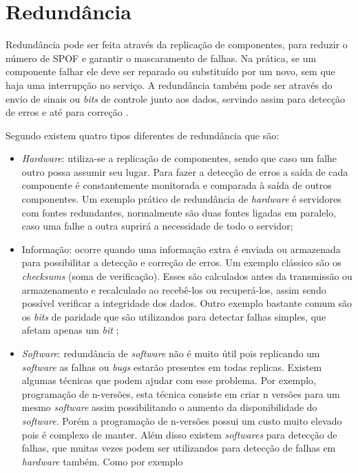\section{Redundância}
\label{section:redundancia}

Redundância pode ser feita através da replicação de componentes, para reduzir o número de \ac{SPOF} e garantir o mascaramento de falhas.
Na prática, se um componente falhar ele deve ser reparado ou substituído por um novo, sem que haja uma interrupção no serviço.
A redundância também pode ser através do envio de sinais ou \textit{bits} de controle junto aos dados, 
servindo assim para detecção de erros e até para correção \cite{weber2002}.

Segundo \cite{norvag2000} existem quatro tipos diferentes de redundância que são:
\begin{itemize}
 \item \textit{Hardware}: utiliza-se a replicação de componentes, sendo que caso um falhe outro possa assumir seu lugar. 
 Para fazer a detecção de erros a saída de cada componente é constantemente monitorada e comparada à saída de outros componentes.
 Um exemplo prático de redundância de \textit{hardware} é servidores com fontes redundantes, normalmente são duas fontes ligadas em paralelo, 
 caso uma falhe a outra suprirá a necessidade de todo o servidor;
 \item Informação: ocorre quando uma informação extra é enviada ou armazenada para possibilitar a detecção e correção de erros.
 Um exemplo clássico são os \textit{checksums} (soma de verificação). Esses são calculados antes da transmissão ou armazenamento 
 e recalculado ao recebê-los ou recuperá-los, assim sendo possível verificar a integridade dos dados. Outro exemplo bastante comum são os 
 \textit{bits} de paridade que são utilizandos para detectar falhas simples, que afetam apenas um \textit{bit} \cite{weber2002};
 \item \textit{Software}: redundância de \textit{software} não é muito útil pois replicando um \textit{software} as falhas ou 
 \textit{bugs} estarão presentes em todas replicas. Existem algumas técnicas que podem ajudar com esse problema. Por exemplo, programação 
 de n-versões, esta técnica consiste em criar n versões para um mesmo \textit{software} assim possibilitando o aumento da disponibilidade do 
 \textit{software}. Porém a programação de n-versões possui um custo muito elevado pois é complexo de manter. Além disso existem \textit{softwares} 
 para detecção de falhas, que muitas vezes podem ser utilizandos para detecção de falhas em \textit{hardware} também. Como por exemplo 

\end{itemize}
